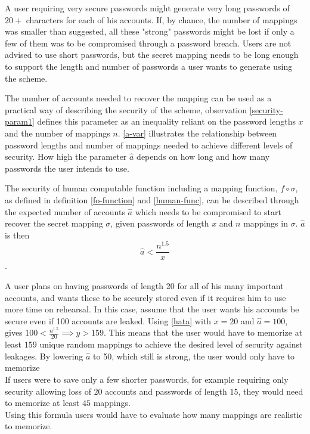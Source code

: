 \par A user requiring very secure passwords might generate very long passwords of $20+$ characters for each of his accounts. If, by chance, the number of mappings was smaller than suggested, all these "strong" passwords might be lost if only a few of them was to be compromised through a password breach. Users are not advised to use short passwords, but the secret mapping needs to be long enough to support the length and number of passwords a user wants to generate using the scheme.

\par The number of accounts needed to recover the mapping can be used as a practical way of describing the security of the scheme, observation \ref{security-param1} defines this parameter as an inequality reliant on the password lengths $x$ and the number of mappings $n$. \autoref{a-var} illustrates the relationship between password lengths and number of mappings needed to achieve different levels of security. How high the parameter $\hat a$ depends on how long and how many passwords the user intends to use. 


\begin{observation}
    \label{security-param1}
    The security of human computable function including a mapping function, $f \circ \sigma$, as defined in definition \ref{fo-function} and \autoref{human-func}, can be described through the expected number of accounts $\hat a$ which needs to be compromised to start recover the secret mapping $\sigma$, given passwords of length $x$ and $n$ mappings in $\sigma$. $\hat a$ is then 
\begin{equation} \hat a < \frac{n^{ 1.5 }}{x} \label{hata} \end{equation}.
    \label{a-theorem}
\end{observation}

\begin{example}
    A user plans on having passwords of length 20 for all of his many important accounts, and wants these to be securely stored even if it requires him to use more time on rehearsal. In this case, assume that the user wants his accounts be secure even if 100 accounts are leaked. Using \autoref{hata} with $x=20$ and $\hat a = 100$, gives $100 < \frac{n^{1.5}}{20} \implies y > 159$. This means that the user would have to memorize at least $159$ unique random mappings to achieve the desired level of security against leakages. By lowering $\hat a$ to 50, which still is strong, the user would only have to memorize  \\
    If users were to save only a few shorter passwords, for example requiring only security allowing loss of $20$ accounts and passwords of length $15$, they would need to memorize at least $45$ mappings. \\
    Using this formula users would have to evaluate how many mappings are realistic to memorize. 
\end{example}

